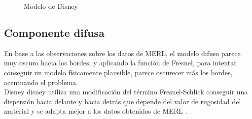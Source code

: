     \begin{figure}[H]
        \vspace{0.5cm}
        \centering
        \caption{Modelo de Disney}
        \vspace{0.5cm}
    \end{figure}
        
        \subsection{Componente difusa}
    
        En base a las observaciones sobre los datos de MERL, el modelo difuso parece muy oscuro hacia los bordes, y aplicando
        la funci\'on de Fresnel, para intentar conseguir un modelo f\'isicamente plausible, parece oscurecer m\'as los bordes,
        acentuando el problema.\\
        Disney \autocite{}{disney} utiliza una modificaci\'on del t\'ermino Fresnel-Schlick
        conseguir una dispersi\'on hacia delante y hacia detr\'as que depende del valor de rugosidad del material y se
        adapta mejor a los datos obtenidos de MERL \autocite{merl}.
    
